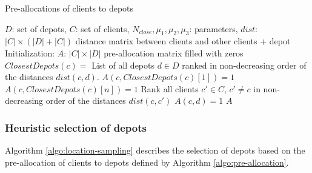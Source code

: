 \documentclass[a4paper,10pt]{article}
\begin{document}
\begin{linenumbers}
 
 \begin{algorithm}
	\caption{Pre-allocations of clients to depots}
	\label{algo:pre-allocation}
	\begin{algorithmic}[1]
		\REQUIRE  $D$: set of depots, $C$: set of clients, $N_{close}, \mu_1, \mu_2, \mu_3$: parameters, 
		$dist$: $|C|\times (|D|+|C|)$ distance matrix between clients and other clients + depot
		\STATE Initialization: $A$: $|C| \times |D|$ pre-allocation matrix filled with zeros
			\STATE $ClosestDepots(c) = $ List of all depots $d \in D$ ranked in non-decreasing order of the distances $dist(c,d)$.
			\STATE 	$A(c,ClosestDepots(c)[1]) =1$ 	
					\STATE 	$A(c,ClosestDepots(c)[n]) =1$ 			
				\ENDIF
			\ENDFOR
		\ENDFOR
			\STATE Rank all clients $c' \in C$, $c' \neq c$ in non-decreasing order of the distances $dist(c,c')$ 
							\STATE $A(c,d) =1$
						\ENDIF
					\ENDFOR
				\ENDIF
			\ENDFOR
		\ENDFOR
		\RETURN $A$
	\end{algorithmic}
\end{algorithm}






\newpage

\subsubsection{Heuristic selection of depots}

Algorithm \ref{algo:location-sampling} describes the selection of depots based on the pre-allocation of clients to depots defined by Algorithm \ref{algo:pre-allocation}. 


\end{linenumbers}
\end{document}
